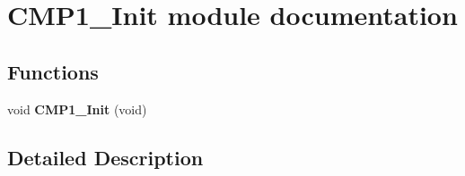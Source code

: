 \hypertarget{group___c_m_p1___init__module}{}\section{C\+M\+P1\+\_\+\+Init module documentation}
\label{group___c_m_p1___init__module}
\subsection*{Functions}
\begin{DoxyCompactItemize}
\item 
void {\bfseries C\+M\+P1\+\_\+\+Init} (void)\hypertarget{group___c_m_p1___init__module_ga2c3ab86759da87789f1c6fccfe3c06c6}{}\label{group___c_m_p1___init__module_ga2c3ab86759da87789f1c6fccfe3c06c6}

\end{DoxyCompactItemize}


\subsection{Detailed Description}
